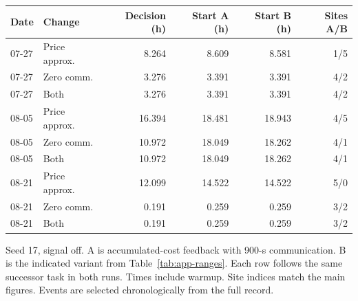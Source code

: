 \par\medskip\Needspace{187pt}
\noindent\begin{minipage}{\textwidth}
\centering\footnotesize\setlength{\tabcolsep}{3pt}\renewcommand{\arraystretch}{1.13}
\label{tab:app-mechanism-events}
\begin{tabular*}{\textwidth}{@{\extracolsep{\fill}}llrrrr@{}}
\toprule
Date & Change & Decision (h) & Start A (h) & Start B (h) & Sites A/B\\
\midrule
07-27 & Price approx. & 8.264 & 8.609 & 8.581 & 1/5\\
07-27 & Zero comm. & 3.276 & 3.391 & 3.391 & 4/2\\
07-27 & Both & 3.276 & 3.391 & 3.391 & 4/2\\
08-05 & Price approx. & 16.394 & 18.481 & 18.943 & 4/5\\
08-05 & Zero comm. & 10.972 & 18.049 & 18.262 & 4/1\\
08-05 & Both & 10.972 & 18.049 & 18.262 & 4/1\\
08-21 & Price approx. & 12.099 & 14.522 & 14.522 & 5/0\\
08-21 & Zero comm. & 0.191 & 0.259 & 0.259 & 3/2\\
08-21 & Both & 0.191 & 0.259 & 0.259 & 3/2\\
\bottomrule\end{tabular*}
\par\smallskip\raggedright Seed 17, signal off. A is accumulated-cost feedback with 900-s communication. B is the indicated variant from Table~\ref{tab:app-ranges}. Each row follows the same successor task in both runs. Times include warmup. Site indices match the main figures. Events are selected chronologically from the full record.
\end{minipage}\par\medskip
